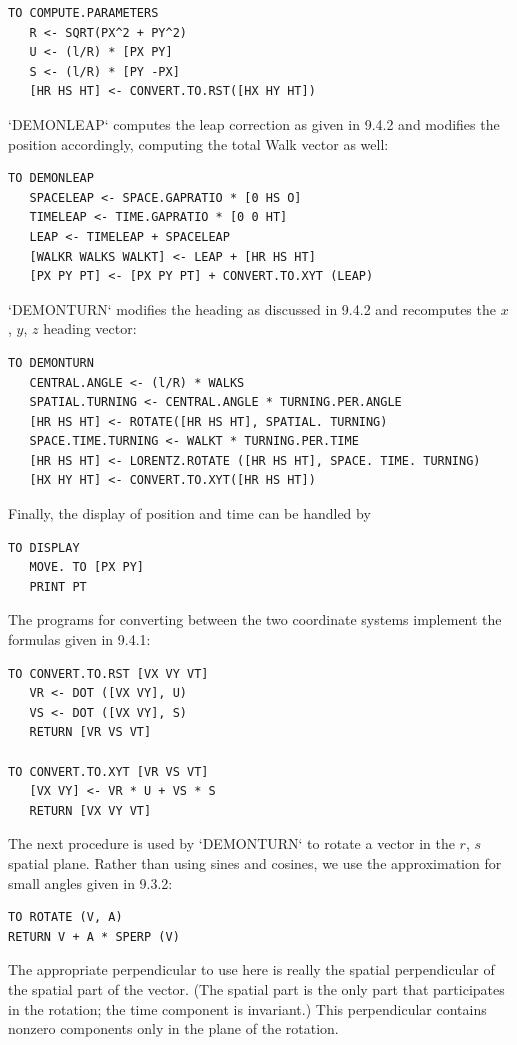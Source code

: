 \documentclass{book}
\begin{document}
\begin{verbatim}
TO COMPUTE.PARAMETERS
   R <- SQRT(PX^2 + PY^2)
   U <- (l/R) * [PX PY]
   S <- (l/R) * [PY -PX]
   [HR HS HT] <- CONVERT.TO.RST([HX HY HT])
\end{verbatim}
\textsc{`DEMONLEAP`} computes the leap correction as given in 9.4.2 and modifies
the position accordingly, computing the total Walk vector as well:

\begin{verbatim}
TO DEMONLEAP
   SPACELEAP <- SPACE.GAPRATIO * [0 HS O]
   TIMELEAP <- TIME.GAPRATIO * [0 0 HT]
   LEAP <- TIMELEAP + SPACELEAP
   [WALKR WALKS WALKT] <- LEAP + [HR HS HT]
   [PX PY PT] <- [PX PY PT] + CONVERT.TO.XYT (LEAP)
\end{verbatim}
\textsc{`DEMONTURN`} modifies the heading as discussed in 9.4.2 and recomputes
the $x$, $y$, $z$ heading vector:

\begin{verbatim}
TO DEMONTURN
   CENTRAL.ANGLE <- (l/R) * WALKS
   SPATIAL.TURNING <- CENTRAL.ANGLE * TURNING.PER.ANGLE
   [HR HS HT] <- ROTATE([HR HS HT], SPATIAL. TURNING)
   SPACE.TIME.TURNING <- WALKT * TURNING.PER.TIME
   [HR HS HT] <- LORENTZ.ROTATE ([HR HS HT], SPACE. TIME. TURNING)
   [HX HY HT] <- CONVERT.TO.XYT([HR HS HT])
\end{verbatim}
Finally, the display of position and time can be handled by

\begin{verbatim}
TO DISPLAY
   MOVE. TO [PX PY]
   PRINT PT
\end{verbatim}
The programs for converting between the two coordinate systems implement the formulas given in 9.4.1:

\begin{verbatim}
TO CONVERT.TO.RST [VX VY VT]
   VR <- DOT ([VX VY], U)
   VS <- DOT ([VX VY], S)
   RETURN [VR VS VT]

TO CONVERT.TO.XYT [VR VS VT]
   [VX VY] <- VR * U + VS * S
   RETURN [VX VY VT]
\end{verbatim}
The next procedure is used by \textsc{`DEMONTURN`} to rotate a vector in the
$r$, $s$ spatial plane. Rather than using sines and cosines, we use the
approximation for small angles given in 9.3.2:

\begin{verbatim}
TO ROTATE (V, A)
RETURN V + A * SPERP (V)
\end{verbatim}
The appropriate perpendicular to use here is really the spatial perpendicular of the spatial part of the vector. (The spatial part is the only
part that participates in the rotation; the time component is invariant.)
This perpendicular contains nonzero components only in the plane of
the rotation.
\end{document}
